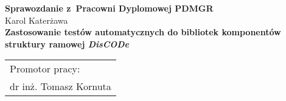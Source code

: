 
\begin{titlepage}
  \noindent

  \begin{center}
    \textbf{Sprawozdanie z~Pracowni Dyplomowej PDMGR}\\[15mm]
    \large Karol Katerżawa\\[10mm]
    \Large \textbf{Zastosowanie testów automatycznych do bibliotek komponentów struktury ramowej \textit{DisCODe}}
  \end{center}
  \vspace{20mm}
  \begin{flushright}
    \begin{tabular}{l}
      Promotor pracy:\\
      \large dr inż. Tomasz Kornuta
    \end{tabular}
  \end{flushright}
  \vfill

\end{titlepage}

